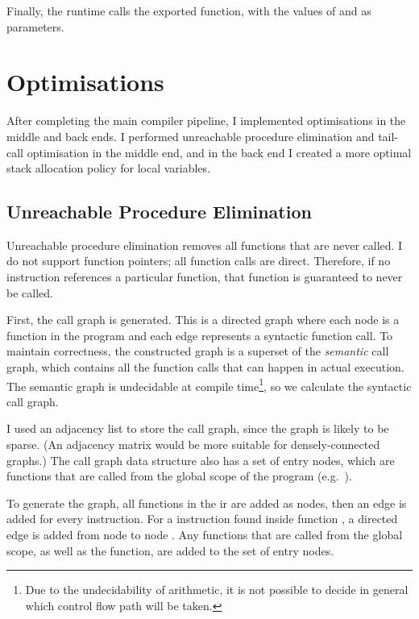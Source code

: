 \documentclass[00-main.tex]{subfiles}
\begin{document}
Finally, the runtime calls the exported  function, with the values of  and  as parameters.

\section{Optimisations}\label{sec:impl:optimisations}

After completing the main compiler pipeline, I implemented optimisations in the middle and back ends.
I performed unreachable procedure elimination and tail-call optimisation in the middle end, and in the back end I created a more optimal stack allocation policy for local variables.

\subsection{Unreachable Procedure Elimination}\label{sec:impl:unreachable procedure elimination}

Unreachable procedure elimination removes all functions that are never called.
I do not support function pointers; all function calls are direct.
Therefore, if no  instruction references a particular function, that function is guaranteed to never be called.

First, the call graph is generated.
This is a directed graph where each node is a function in the program and each edge represents a syntactic function call.
To maintain correctness, the constructed graph is a superset of the \emph{semantic} call graph, which contains all the function calls that can happen in actual execution.
The semantic graph is undecidable at compile time\footnote{Due to the undecidability of arithmetic, it is not possible to decide in general which control flow path will be taken.}, so we calculate the syntactic call graph.

I used an adjacency list to store the call graph, since the graph is likely to be sparse.
(An adjacency matrix would be more suitable for densely-connected graphs.)
The call graph data structure also has a set of entry nodes, which are functions that are called from the global scope of the program (e.g.\ ). %

To generate the graph, all functions in the \gls{ir} are added as nodes, then an edge is added for every  instruction.
For a  instruction found inside function , a directed edge is added from node  to node .
Any functions that are called from the global scope, as well as the  function, are added to the set of entry nodes.
\end{document}
